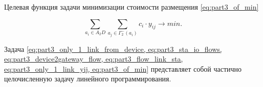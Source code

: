 Целевая функция задачи минимизации стоимости размещения \cref{eq:part3_of_min}

\begin{equation}\label{eq:part3_of_min}
    \sum_{a_i \in A_2D} \sum_{a_j \in \Gamma_2^-(a_i)}c_i \cdot y_{ij} \to min.
\end{equation}

Задача \cref{eq:part3_only_1_link_from_device, eq:part3_sta_io_flows, eq:part3_device2gateway_flow, eq:part3_flow_link_sta, eq:part3_only_1_link_yij, eq:part3_of_min} представляет собой частично целочисленную задачу линейного программирования. 








